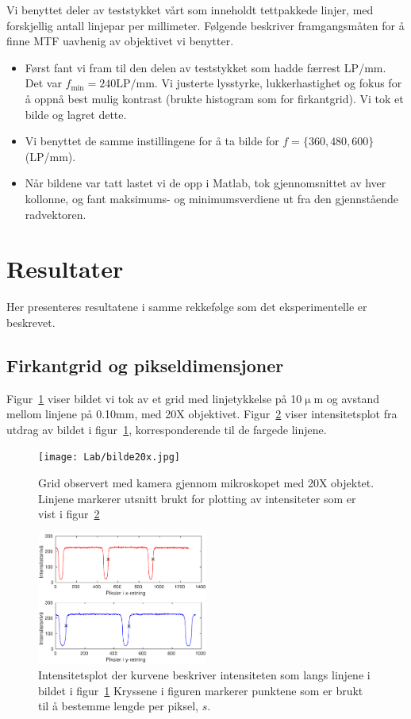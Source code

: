 \documentclass[a4paper,11pt, twocolumn]{article}
\begin{document}
Vi benyttet deler av teststykket vårt som inneholdt tettpakkede linjer, med forskjellig antall linjepar per millimeter. Følgende beskriver framgangsmåten for å finne MTF uavhenig av objektivet vi benytter.  
\begin{itemize}
	\item Først fant vi fram til den delen av teststykket som hadde færrest LP/mm. Det var $f_\text{min} = 240\text{LP/mm}$. Vi justerte lysstyrke, lukkerhastighet og fokus for å oppnå best mulig kontrast (brukte histogram som for firkantgrid). Vi tok et bilde og lagret dette.
	\item Vi benyttet de samme instillingene for å ta bilde for $f = \{360, 480, 600\}$(LP/mm). 
	\item Når bildene var tatt lastet vi de opp i Matlab, tok gjennomsnittet av hver kollonne, og fant maksimums- og minimumsverdiene ut fra den gjennstående radvektoren.
\end{itemize}
\section{Resultater}
Her presenteres resultatene i samme rekkefølge som det eksperimentelle er beskrevet.  \subsection{Firkantgrid og pikseldimensjoner}
Figur~\ref{fig:grid20x} viser bildet vi tok av et grid med linjetykkelse på 10$\upmu$m og avstand mellom linjene på 0.10mm, med 20X objektivet. Figur~\ref{fig:intensitet20x} viser intensitetsplot fra utdrag av bildet i figur~\ref{fig:grid20x}, korresponderende til de fargede linjene.  \begin{figure}[!ht]
	\centering
	\texttt{[image: Lab/bilde20x.jpg]}
	\caption{Grid observert med kamera gjennom mikroskopet med 20X objektet. Linjene markerer utsnitt brukt for plotting av intensiteter som er vist i figur~\ref{fig:intensitet20x}}
	\label{fig:grid20x}
\end{figure}

\begin{figure}[!ht]
	\centering
	\includegraphics[width=0.5\textwidth]{Lab/gitter20x.eps}
	\caption{Intensitetsplot der kurvene beskriver intensiteten som langs linjene i bildet i figur~\ref{fig:grid20x} Kryssene i figuren markerer punktene som er brukt til å bestemme lengde per piksel, $s$.}
	\label{fig:intensitet20x}
\end{figure}
\end{document}
